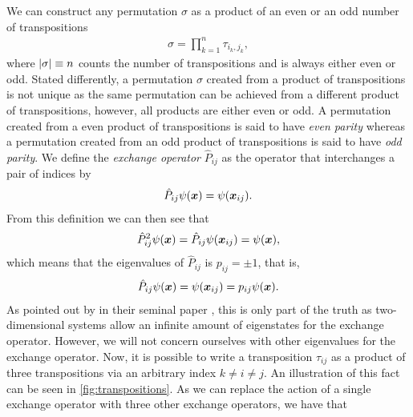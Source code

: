         We can construct any permutation $\sigma$ as a product of an even or an
        odd number of transpositions \cite{fraleigh2003first}
        \begin{align}
            \sigma = \prod_{k = 1}^{n} \tau_{i_k, j_k},
        \end{align}
        where $\abs{\sigma} \equiv n$ counts the number of transpositions and is
        always either even or odd.
        Stated differently, a permutation $\sigma$ created from a product of
        transpositions is not unique as the same permutation can be achieved
        from a different product of transpositions, however, all products are
        either even or odd.
        A permutation created from a even product of transpositions is said to
        have \emph{even parity} whereas a permutation created from an odd
        product of transpositions is said to have \emph{odd parity}.
        We define the \emph{exchange operator} $\hat{P}_{ij}$ as the operator
        that interchanges a pair of indices by
        \begin{align}
            \hat{P}_{ij}\psi(\boldsymbol{x})
            = \psi(\boldsymbol{x}_{ij}).
        \end{align}
        From this definition we can then see that
        \begin{align}
            \hat{P}^2_{ij}\psi(\boldsymbol{x})
            = \hat{P}_{ij}\psi(\boldsymbol{x}_{ij})
            = \psi(\boldsymbol{x}),
        \end{align}
        which means that the eigenvalues of $\hat{P}_{ij}$ is $p_{ij} = \pm
        1$, that is,
        \begin{align}
            \hat{P}_{ij}\psi(\boldsymbol{x})
            = \psi(\boldsymbol{x}_{ij})
            = p_{ij} \psi(\boldsymbol{x}).
        \end{align}
        As pointed out by \citeauthor{leinaas1977} in their seminal paper
         \cite{leinaas1977}, this is only part of the
        truth as two-dimensional systems allow an infinite amount of
        eigenstates for the exchange operator.
        However, we will not concern ourselves with other eigenvalues for the
        exchange operator.
        Now, it is possible to write a transposition $\tau_{ij}$ as a product of
        three transpositions via an arbitrary index $k \neq i \neq j$.
        An illustration of this fact can be seen in
        \autoref{fig:transpositions}.
        As we can replace the action of a single exchange operator with three
        other exchange operators, we have that
